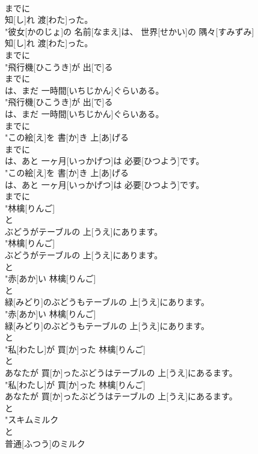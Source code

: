 \documentclass[8pt]{extreport}
\begin{document}
\begin{CJK}{UTF8}{min}
\\	までに
\\	知[し]れ 渡[わた]った。
\\	"彼女[かのじょ]の 名前[なまえ]は、 世界[せかい]の 隅々[すみずみ]
\\	知[し]れ 渡[わた]った。
\\	までに
\\	"飛行機[ひこうき]が 出[で]る
\\	までに
\\	は、まだ 一時間[いちじかん]ぐらいある。
\\	"飛行機[ひこうき]が 出[で]る
\\	は、まだ 一時間[いちじかん]ぐらいある。
\\	までに
\\	"この絵[え]を 書[か]き 上[あ]げる
\\	までに
\\	は、あと 一ヶ月[いっかげつ]は 必要[ひつよう]です。
\\	"この絵[え]を 書[か]き 上[あ]げる
\\	は、あと 一ヶ月[いっかげつ]は 必要[ひつよう]です。
\\	までに
\\	"林檎[りんご]
\\	と
\\	ぶどうがテーブルの 上[うえ]にあります。
\\	"林檎[りんご]
\\	ぶどうがテーブルの 上[うえ]にあります。
\\	と
\\	"赤[あか]い 林檎[りんご]
\\	と
\\	緑[みどり]のぶどうもテーブルの 上[うえ]にあります。
\\	"赤[あか]い 林檎[りんご]
\\	緑[みどり]のぶどうもテーブルの 上[うえ]にあります。
\\	と
\\	"私[わたし]が 買[か]った 林檎[りんご]
\\	と
\\	あなたが 買[か]ったぶどうはテーブルの 上[うえ]にあるます。
\\	"私[わたし]が 買[か]った 林檎[りんご]
\\	あなたが 買[か]ったぶどうはテーブルの 上[うえ]にあるます。
\\	と
\\	"スキムミルク
\\	と
\\	普通[ふつう]のミルク

\end{CJK}
\end{document}
